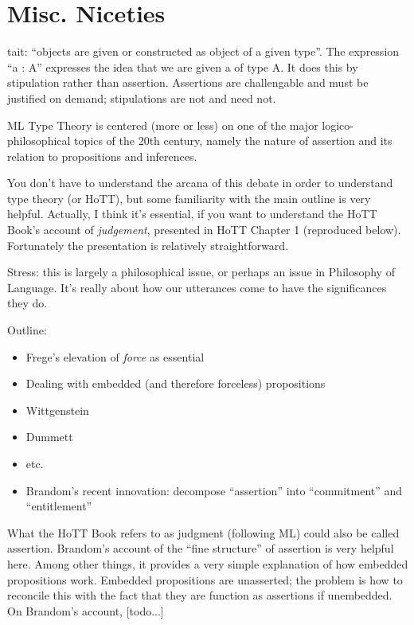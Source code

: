 \section{Misc. Niceties}

\begin{ednote}
  tait: ``objects are given or constructed as object of a given
  type''.  The expression ``a : A'' expresses the idea that we are
  given a of type A.  It does this by stipulation rather than
  assertion.  Assertions are challengable and must be justified on
  demand; stipulations are not and need not.
\end{ednote}

ML Type Theory is centered (more or less) on one of the major
logico-philosophical topics of the 20th century, namely the nature of
assertion and its relation to propositions and inferences.

You don't have to understand the arcana of this debate in order to
understand type theory (or HoTT), but some familiarity with the main
outline is very helpful.  Actually, I think it's essential, if you
want to understand the HoTT Book's account of \textit{judgement},
presented in HoTT Chapter 1 (reproduced below).  Fortunately the
presentation is relatively straightforward.

\begin{remark}
  Stress: this is largely a philosophical issue, or perhaps an issue
  in Philosophy of Language.  It's really about how our utterances
  come to have the significances they do.
\end{remark}

Outline:

\begin{itemize}
\item Frege's elevation of \textit{force} as essential
\item Dealing with embedded (and therefore forceless) propositions
\item Wittgenstein
\item Dummett
\item etc.
\item Brandom's recent innovation: decompose ``assertion'' into ``commitment'' and ``entitlement''
\end{itemize}

What the HoTT Book refers to as judgment (following ML) could also be
called assertion.  Brandom's account of the ``fine structure'' of
assertion is very helpful here.  Among other things, it provides a
very simple explanation of how embedded propositions work.  Embedded
propositions are unasserted; the problem is how to reconcile this with
the fact that they are function as assertions if unembedded.  On
Brandom's account, [todo...]

